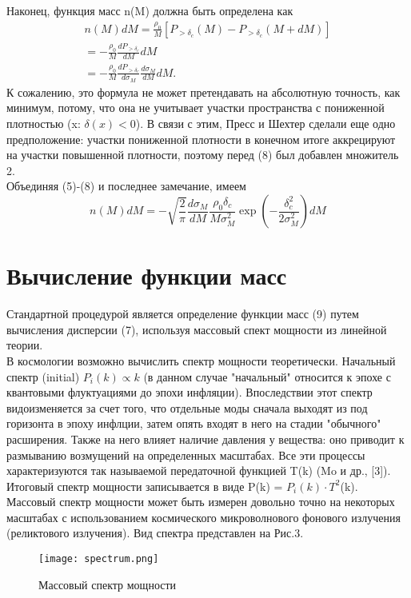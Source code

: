 \documentclass[11pt]{article}
\begin{document}
Наконец, функция масс n(M) должна быть определена как
\begin{equation}
\begin{split}
n(M)dM = \frac{\rho_0}{M}[P_{> \delta_c} (M) - P_{> \delta_c} (M + dM)] \\ = - \frac{\rho_0}{M}\frac{dP_{> \delta_c}}{dM}dM \\ = - \frac{\rho_0}{M}\frac{dP_{> \delta_c}}{d \sigma_M} \frac{d\sigma_M}{dM}dM.
\end{split}
\end{equation}
К сожалению, это формула не может претендавать на абсолютную точность, как минимум, потому, что она не учитывает участки пространства с пониженной плотностью (x: $\delta(x)<0$). В связи с этим, Пресс и Шехтер сделали еще одно предположение: участки пониженной плотности в конечном итоге аккрецируют на участки повышенной плотности, поэтому перед (8) был добавлен множитель 2.\\
Объединяя (5)-(8) и последнее замечание, имеем 
\begin{equation}
n(M)dM = -\sqrt{\frac{2}{\pi}} \frac{d\sigma_M}{dM}\frac{\rho_0\delta_c}{M\sigma_{M}^{2}}\exp(-\frac{\delta_{c}^{2}}{2\sigma_{M}^{2}})dM
\end{equation}

\section{Вычисление функции масс}
Стандартной процедурой является определение функции масс (9) путем вычисления дисперсии (7), используя массовый спект мощности из линейной теории.\\
В космологии возможно вычислить спектр мощности теоретически. Начальный спектр (initial) $P_i(k)\propto k$ (в данном случае "начальный" относится к эпохе с квантовыми флуктуациями до эпохи инфляции). Впоследствии этот спектр видоизменяется за счет того, что отдельные моды сначала выходят из под горизонта в эпоху инфлции, затем опять входят в него на стадии "обычного" расширения. Также на него влияет наличие давления у вещества: оно приводит к размыванию возмущений на определенных масштабах. Все эти процессы характеризуются так называемой передаточной функцией T(k) (Mo и др., [3]). Итоговый спектр мощности записывается в виде P(k) = $P_i(k)\cdot T^2$(k). Массовый спектр мощности может быть измерен довольно точно на некоторых масштабах с использованием космического микроволнового фонового излучения (реликтового излучения). Вид спектра представлен на Рис.3.\\
\begin{figure}[H]
\centering
\texttt{[image: spectrum.png]}
\caption{Массовый спектр мощности}  
\end{figure}
\end{document}
